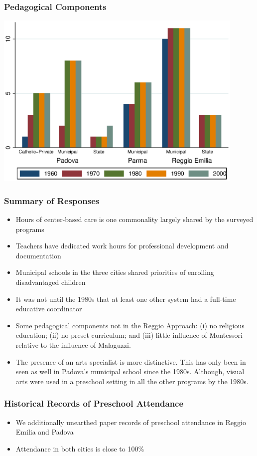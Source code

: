 \documentclass[dynamic]{JJH-Beamer}
\begin{document}
\begin{frame}
\frametitle{Pedagogical Components}
\includegraphics[width=0.9\textwidth]{../../output/aggregatePedagogical.eps}
\end{frame}


\begin{frame}
\frametitle{Summary of Responses}
\footnotesize
\begin{itemize}
	\item Hours of center-based care is one commonality largely shared by the surveyed programs
	\item  Teachers have dedicated work hours for professional development and documentation
	\item Municipal schools in the three cities shared priorities of enrolling disadvantaged children
	\item It was not until the 1980s that at least one other system had a full-time educative coordinator
	\item Some pedagogical components not in the Reggio Approach: (i) no religious education; (ii) no preset curriculum; and (iii) little influence of Montessori relative to the influence of Malaguzzi. 
	\item The presence of an arts specialist is more distinctive. This has only been in seen as well in Padova's municipal school since the 1980s. Although, visual arts were used in a preschool setting in all the other programs by the 1980s.  
\end{itemize}
\end{frame}

\begin{frame}
\frametitle{Historical Records of Preschool Attendance}
\begin{itemize}
	\item We additionally unearthed paper records of preschool attendance in Reggio Emilia and Padova
	\item Attendance in both cities is close to 100\% 
\end{itemize}
\end{frame}
\end{document}
